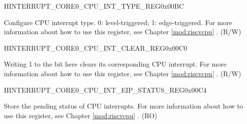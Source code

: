 \begin{register}{H}{INTERRUPT\_CORE0\_CPU\_INT\_TYPE\_REG}{0x00BC}\label{regdesc:INTERRUPTCORE0CPUINTTYPEREG}
%
\regnewline%
\begin{regdesc}\begin{reglist}
\label{fielddesc:INTERRUPTCORE0CPUINTTYPE}\item [INTERRUPT\_CORE0\_CPU\_INT\_TYPE] Configure CPU interrupt type. 0: level-triggered; 1: edge-triggered. For more information about how to use this register, see Chapter \ref{mod:riscvcpu} \textit{}. (R/W)
\end{reglist}\end{regdesc}
\end{register}


\begin{register}{H}{INTERRUPT\_CORE0\_CPU\_INT\_CLEAR\_REG}{0x00C0}\label{regdesc:INTERRUPTCORE0CPUINTCLEARREG}
%
\regnewline%
\begin{regdesc}\begin{reglist}
\label{fielddesc:INTERRUPTCORE0CPUINTCLEAR}\item [INTERRUPT\_CORE0\_CPU\_INT\_CLEAR] Writing 1 to the bit here clears its corresponding CPU interrupt. For more information about how to use this register, see Chapter \ref{mod:riscvcpu} \textit{}. (R/W)
\end{reglist}\end{regdesc}
\end{register}


\begin{register}{H}{INTERRUPT\_CORE0\_CPU\_INT\_EIP\_STATUS\_REG}{0x00C4}\label{regdesc:INTERRUPTCORE0CPUINTEIPSTATUSREG}
%
\regnewline%
\begin{regdesc}\begin{reglist}
\label{fielddesc:INTERRUPTCORE0CPUINTEIPSTATUS}\item [INTERRUPT\_CORE0\_CPU\_INT\_EIP\_STATUS] Store the pending status of CPU interrupts. For more information about how to use this register, see Chapter \ref{mod:riscvcpu} \textit{}. (RO)
\end{reglist}\end{regdesc}
\end{register}


